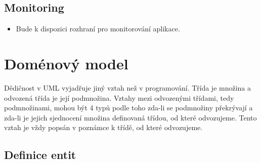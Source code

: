 \subsection{Monitoring}\label{subsec:monitoring}

\begin{itemize}
\item
  Bude k dispozici rozhraní pro monitorování aplikace.
\end{itemize}

\section{Doménový model}\label{sec:domenovy-model}



\begin{tcolorbox}
Dědičnost v UML vyjadřuje jiný vztah než v programování.
Třída je množina a odvozená třída je její podmnožina.
Vztahy mezi odvozenými třídami, tedy podmnožinami, mohou být 4 typů podle toho zda-li se podmnožiny překrývají a zda-li je jejich sjednocení množina definovaná třídou, od které odvozujeme.
Tento vztah je vždy popsán v poznámce k třídě, od které odvozujeme.
\end{tcolorbox}

\subsection{Definice entit}\label{subsec:definiceentit}

